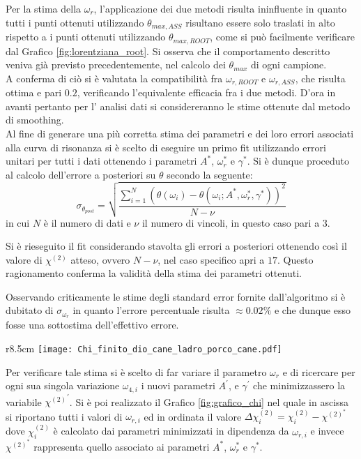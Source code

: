 \documentclass[a4paper,11pt,oneside]{article}
\begin{document}
Per la stima della $\omega_{r}$, l'applicazione dei due metodi risulta ininfluente in quanto tutti i punti ottenuti utilizzando  $\theta_ {max, ASS}$ risultano essere solo traslati in alto rispetto a i punti ottenuti utilizzando  $\theta_{max, ROOT}$, come si può facilmente verificare dal Grafico \ref{fig:lorentziana_root}. Si osserva che il comportamento descritto veniva già previsto precedentemente, nel calcolo dei $\theta_{max}$ di ogni campione.\\
A conferma di ciò si è valutata la compatibilità fra $\omega_{r, ROOT}$ e $\omega_{r, ASS}$, che risulta ottima e pari $0.2$, verificando l'equivalente efficacia fra i due metodi. 
D'ora in avanti pertanto per l' analisi dati si considereranno le stime ottenute dal metodo di smoothing.\\

Al fine di generare una più corretta stima dei parametri e dei loro errori associati alla curva di risonanza si è scelto di eseguire un primo fit utilizzando errori unitari per tutti i dati ottenendo i parametri $A^{\ast}$, $\omega_{r}^{\ast}$ e $\gamma^{\ast}$. Si è dunque proceduto al calcolo dell'errore a posteriori su $\theta$ secondo la seguente:
\begin{equation*}
    \sigma_{\theta_{post}}=\sqrt{\frac{\sum_{i=1}^{N} (\theta(\omega_{i})-\theta(\omega_{i} ; A^{\ast}, \omega_{r}^{\ast}, \gamma^{\ast}))^{2}}{N-\nu}}
\end{equation*}
in cui $N$ è il numero di dati e $\nu$ il numero di vincoli, in questo caso pari a $3$.

Si è rieseguito il fit considerando stavolta gli errori a posteriori ottenendo così il valore di $\chi^{(2)}$ atteso, ovvero $N-\nu$, nel caso specifico apri a $17$. Questo ragionamento conferma la validità della stima dei parametri ottenuti. 

Osservando criticamente le stime degli standard error fornite dall'algoritmo si è dubitato di $\sigma_{\omega_{r}}$ in quanto l'errore percentuale risulta $\approx 0.02 \%$ e che dunque esso fosse una sottostima dell'effettivo errore.\\
\begin{wrapfigure}{r}{8.5cm}
    \vspace{-0.5cm}
    \centering
    \texttt{[image: Chi\_finito\_dio\_cane\_ladro\_porco\_cane.pdf]}
    \caption{Grafico $\Delta \chi^2$}
    \label{fig:grafico_chi}
    \vspace{-10pt}
\end{wrapfigure}
Per verificare tale stima si è scelto di far variare il parametro $\omega_r$ e di ricercare per ogni sua singola variazione $\omega_{4, i}$ i nuovi parametri $A^{'}$, e $\gamma^{'}$ che minimizzassero la variabile ${\chi^{(2)}}^{'}$. Si è poi realizzato il Grafico \ref{fig:grafico_chi} nel quale in ascissa si riportano tutti i valori di $\omega_{r, i}$ ed in ordinata il valore $\Delta\chi^{(2)}_{i}=\chi^{(2)}_{i}-\chi^{(2)}^{\ast}$ dove $\chi^{(2)}_{i}$ è calcolato dai parametri minimizzati in dipendenza da $\omega_{r, i}$ e invece  $\chi^{(2)}^{\ast}$  rappresenta quello associato ai parametri $A^{\ast}$, $\omega_{r}^{\ast}$ e $\gamma^{\ast}$.
\end{document}
